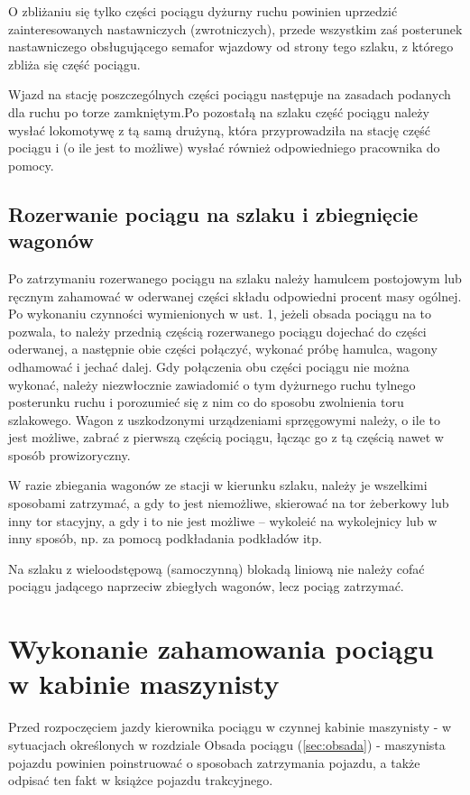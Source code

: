 O zbliżaniu się tylko części pociągu dyżurny ruchu powinien uprzedzić zainteresowanych nastawniczych (zwrotniczych), przede wszystkim zaś posterunek nastawniczego obsługującego semafor wjazdowy od strony tego szlaku, z którego zbliża
się część pociągu.

Wjazd na stację poszczególnych części pociągu następuje na zasadach podanych dla ruchu po torze zamkniętym.Po pozostałą na szlaku część pociągu należy wysłać lokomotywę z tą samą drużyną, która przyprowadziła na stację część pociągu i (o
ile jest to możliwe) wysłać również odpowiedniego pracownika do pomocy.

\section{Rozerwanie pociągu na szlaku i zbiegnięcie wagonów}

Po zatrzymaniu rozerwanego pociągu na szlaku należy hamulcem postojowym lub ręcznym zahamować w oderwanej części składu odpowiedni procent masy ogólnej. Po wykonaniu czynności wymienionych w ust. 1, jeżeli obsada pociągu na to pozwala, to należy przednią częścią rozerwanego pociągu dojechać do części oderwanej, a następnie obie części połączyć, wykonać próbę hamulca, wagony odhamować i jechać dalej. Gdy połączenia obu części pociągu nie można wykonać, należy niezwłocznie zawiadomić o tym dyżurnego ruchu tylnego posterunku ruchu i porozumieć się z nim co do sposobu zwolnienia toru szlakowego. Wagon z uszkodzonymi urządzeniami sprzęgowymi należy, o ile to jest możliwe, zabrać z pierwszą częścią pociągu, łącząc go z tą częścią nawet w sposób prowizoryczny.

W razie zbiegania wagonów ze stacji w kierunku szlaku, należy je wszelkimi sposobami zatrzymać, a gdy to jest niemożliwe, skierować na tor żeberkowy lub inny tor stacyjny, a gdy i to nie jest możliwe – wykoleić na wykolejnicy lub w inny sposób, np. za pomocą podkładania podkładów itp. 

Na szlaku z wieloodstępową (samoczynną) blokadą liniową nie należy cofać pociągu jadącego naprzeciw zbiegłych wagonów, lecz pociąg zatrzymać.

\chapter{Wykonanie zahamowania pociągu w kabinie maszynisty}

Przed rozpoczęciem jazdy kierownika pociągu w czynnej kabinie maszynisty - w sytuacjach określonych w rozdziale Obsada pociągu (\ref{sec:obsada}) - maszynista pojazdu powinien poinstruować o sposobach zatrzymania pojazdu, a także odpisać ten fakt w książce pojazdu trakcyjnego.

